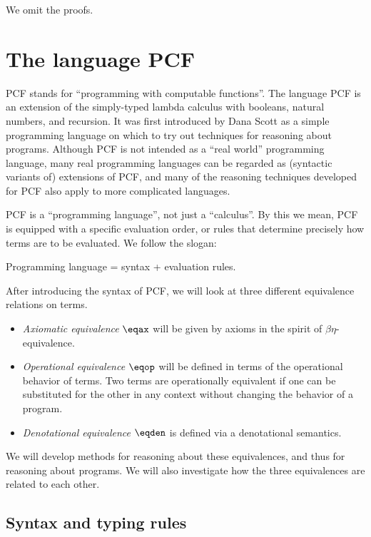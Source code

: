 \documentclass[12pt]{article}
\begin{document}
We omit the proofs.


\section{The language PCF}

PCF stands for ``programming with computable functions''. The language
PCF is an extension of the simply-typed lambda calculus with booleans,
natural numbers, and recursion. It was first introduced by Dana Scott
as a simple programming language on which to try out techniques for
reasoning about programs. Although PCF is not intended as a ``real
world'' programming language, many real programming languages can be
regarded as (syntactic variants of) extensions of PCF, and many of the
reasoning techniques developed for PCF also apply to more complicated
languages.

PCF is a ``programming language'', not just a ``calculus''. By this we
mean, PCF is equipped with a specific evaluation order, or rules that
determine precisely how terms are to be evaluated. We follow the
slogan:
\begin{center}
  Programming language = syntax + evaluation rules.
\end{center}

After introducing the syntax of PCF, we will look at three different
equivalence relations on terms.
\begin{itemize}
\item {\em Axiomatic equivalence} $\eqax$ will be given by axioms in
  the spirit of $\beta\eta$-equivalence.
\item {\em Operational equivalence} $\eqop$ will be defined in terms
  of the operational behavior of terms. Two terms are operationally
  equivalent if one can be substituted for the other in any context
  without changing the behavior of a program.
\item {\em Denotational equivalence} $\eqden$ is defined via a
  denotational semantics.
\end{itemize}

We will develop methods for reasoning about these equivalences, and
thus for reasoning about programs. We will also investigate how the
three equivalences are related to each other.

\subsection{Syntax and typing rules}
\end{document}
